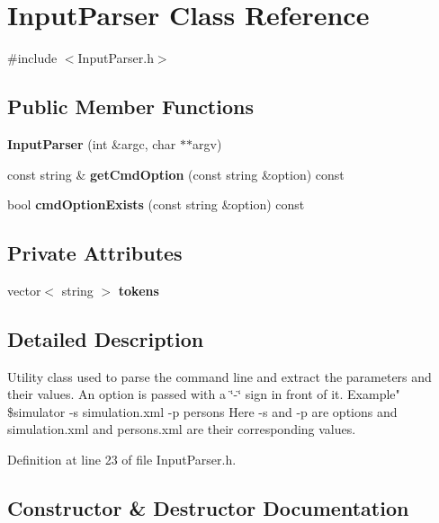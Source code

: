 \section{Input\+Parser Class Reference}
\label{class_input_parser}


{\ttfamily \#include $<$Input\+Parser.\+h$>$}

\subsection*{Public Member Functions}
\begin{DoxyCompactItemize}
\item 
\textbf{ Input\+Parser} (int \&argc, char $\ast$$\ast$argv)
\item 
const string \& \textbf{ get\+Cmd\+Option} (const string \&option) const
\item 
bool \textbf{ cmd\+Option\+Exists} (const string \&option) const
\end{DoxyCompactItemize}
\subsection*{Private Attributes}
\begin{DoxyCompactItemize}
\item 
vector$<$ string $>$ \textbf{ tokens}
\end{DoxyCompactItemize}


\subsection{Detailed Description}
Utility class used to parse the command line and extract the parameters and their values. An option is passed with a \char`\"{}-\/\char`\"{} sign in front of it. Example" \$simulator -\/s simulation.\+xml -\/p persons Here -\/s and -\/p are options and simulation.\+xml and persons.\+xml are their corresponding values. 

Definition at line 23 of file Input\+Parser.\+h.



\subsection{Constructor \& Destructor Documentation}
\mbox{\label{class_input_parser_af9fa5ead1f28b5294a713410df5b9531}} 
